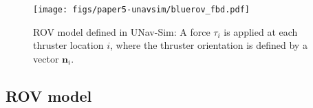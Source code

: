 
\begin{figure}[!t]
    \centering
    \texttt{[image: figs/paper5-unavsim/bluerov\_fbd.pdf]}
    \caption[ROV model defined in UNav-Sim]{ROV model defined in UNav-Sim: A force $\tau_i$ is applied at each thruster location $i$, where the thruster orientation is defined by a vector $\textbf{n}_i$.}
    \label{fig:rov_fbd}
\end{figure}

\subsection{ROV model }




